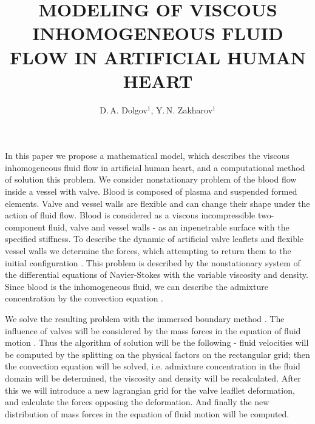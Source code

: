 \documentclass[12pt,a4paper,twoside]{article}
\begin{document}
\title{MODELING OF VISCOUS INHOMOGENEOUS FLUID FLOW IN ARTIFICIAL HUMAN HEART}

\author{D.\,A. Dolgov$^1$, Y.\,N. Zakharov$^1$}



 



In this paper we propose a mathematical model, which describes the viscous inhomogeneous fluid flow in artificial human heart, and a computational method of solution this problem.
We consider nonstationary problem of the blood flow inside a vessel with valve. Blood is composed of plasma and suspended formed elements. Valve and vessel walls are flexible and can change their shape under the action of fluid flow. Blood is considered as a viscous incompressible two-component fluid, valve and vessel walls - as an inpenetrable surface with the specified stiffness. To describe the dynamic of artificial valve leaflets and flexible vessel walls we determine the forces, which attempting to return them to the initial configuration \cite{Griffith:Article}. This problem is described by the nonstationary system of the differential equations of Navier-Stokes \cite{Zakharov_Milosevic:Article} with the variable viscosity and density. Since blood is the inhomogeneous fluid, we can describe the admixture concentration by the convection equation \cite{Zakharov_Milosevic:Article}.

We solve the resulting problem with the immersed boundary method \cite{Griffith:Article}. The influence of valves will be considered by the mass forces in the equation of fluid motion \cite{Griffith:Article}. Thus the algorithm of solution will be the following - fluid velocities will be computed by the splitting on the physical factors on the rectangular grid; then the convection equation will be solved, i.e. admixture concentration in the fluid domain will be determined, the viscosity and density will be recalculated. After this we will introduce a new lagrangian grid for the valve leafllet deformation, and calculate the forces opposing the deformation. And finally the new distribution of mass forces in the equation of fluid motion will be computed.
\end{document}
